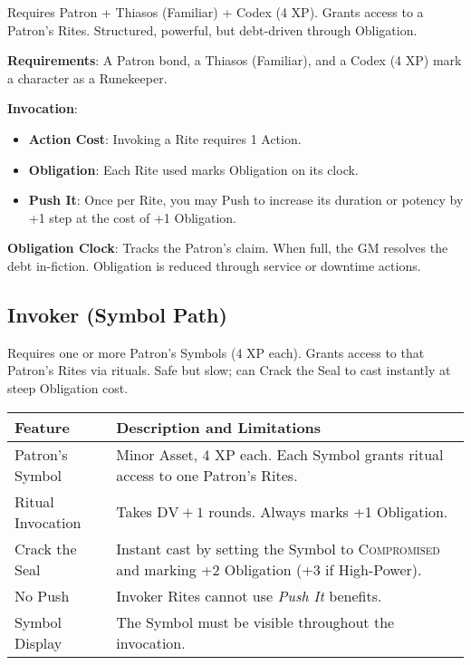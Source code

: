 Requires Patron + Thiasos (Familiar) + Codex (4 XP). Grants access to a Patron's Rites. Structured, powerful, but debt-driven through Obligation.

\textbf{Requirements}: A Patron bond, a Thiasos (Familiar), and a Codex (4 XP) mark a character as a Runekeeper.

\textbf{Invocation}:
\begin{itemize}
    \item \textbf{Action Cost}: Invoking a Rite requires 1 Action.
    \item \textbf{Obligation}: Each Rite used marks Obligation on its clock.
    \item \textbf{Push It}: Once per Rite, you may Push to increase its duration or potency by +1 step at the cost of +1 Obligation.
\end{itemize}

\textbf{Obligation Clock}: Tracks the Patron's claim. When full, the GM resolves the debt in-fiction. Obligation is reduced through service or downtime actions.

\subsection*{Invoker (Symbol Path)}

Requires one or more Patron's Symbols (4 XP each). Grants access to that Patron's Rites via rituals. Safe but slow; can Crack the Seal to cast instantly at steep Obligation cost.

\begin{fatebox}
\begin{tabularx}{\textwidth}{lX}
\toprule
\textbf{Feature} & \textbf{Description and Limitations} \\
\midrule
Patron's Symbol & Minor Asset, 4 XP each. Each Symbol grants ritual access to one Patron's Rites. \\
Ritual Invocation & Takes \(\text{DV} + 1\) rounds. Always marks +1 Obligation. \\
Crack the Seal & Instant cast by setting the Symbol to \textsc{Compromised} and marking +2 Obligation (+3 if High-Power). \\
No Push & Invoker Rites cannot use \emph{Push It} benefits. \\
Symbol Display & The Symbol must be visible throughout the invocation. \\
\bottomrule
\end{tabularx}
\end{fatebox}

